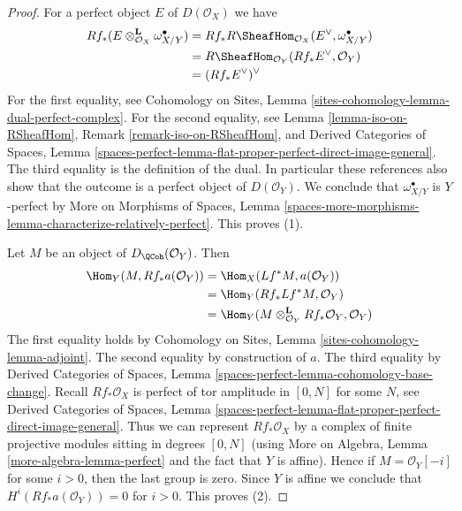\begin{proof}
For a perfect object $E$ of $D(\mathcal{O}_X)$ we have
\begin{align*}
Rf_*(E \otimes_{\mathcal{O}_X}^\mathbf{L} \omega_{X/Y}^\bullet)
& =
Rf_*R\SheafHom_{\mathcal{O}_X}(E^\vee, \omega_{X/Y}^\bullet) \\
& =
R\SheafHom_{\mathcal{O}_Y}(Rf_*E^\vee, \mathcal{O}_Y) \\
& =
(Rf_*E^\vee)^\vee
\end{align*}
For the first equality, see
Cohomology on Sites, Lemma \ref{sites-cohomology-lemma-dual-perfect-complex}.
For the second equality, see Lemma \ref{lemma-iso-on-RSheafHom},
Remark \ref{remark-iso-on-RSheafHom}, and 
Derived Categories of Spaces, Lemma
\ref{spaces-perfect-lemma-flat-proper-perfect-direct-image-general}.
The third equality is the definition of the dual. In particular
these references also show that the outcome is a perfect object
of $D(\mathcal{O}_Y)$. We conclude that $\omega_{X/Y}^\bullet$
is $Y$-perfect by More on Morphisms of Spaces, Lemma
\ref{spaces-more-morphisms-lemma-characterize-relatively-perfect}.
This proves (1).

\medskip\noindent
Let $M$ be an object of $D_\QCoh(\mathcal{O}_Y)$. Then
\begin{align*}
\Hom_Y(M, Rf_*a(\mathcal{O}_Y)) & =
\Hom_X(Lf^*M, a(\mathcal{O}_Y)) \\
& =
\Hom_Y(Rf_*Lf^*M, \mathcal{O}_Y) \\
& =
\Hom_Y(M \otimes_{\mathcal{O}_Y}^\mathbf{L} Rf_*\mathcal{O}_Y, \mathcal{O}_Y)
\end{align*}
The first equality holds by Cohomology on Sites, Lemma
\ref{sites-cohomology-lemma-adjoint}.
The second equality by construction of $a$.
The third equality by Derived Categories of Spaces, Lemma
\ref{spaces-perfect-lemma-cohomology-base-change}.
Recall $Rf_*\mathcal{O}_X$ is perfect of tor amplitude in $[0, N]$
for some $N$, see
Derived Categories of Spaces, Lemma
\ref{spaces-perfect-lemma-flat-proper-perfect-direct-image-general}.
Thus we can represent $Rf_*\mathcal{O}_X$ by a complex of
finite projective modules sitting in degrees $[0, N]$
(using More on Algebra, Lemma \ref{more-algebra-lemma-perfect}
and the fact that $Y$ is affine).
Hence if $M = \mathcal{O}_Y[-i]$ for some $i > 0$, then the last
group is zero. Since $Y$ is affine we conclude that
$H^i(Rf_*a(\mathcal{O}_Y)) = 0$ for $i > 0$.
This proves (2).


\end{proof}
